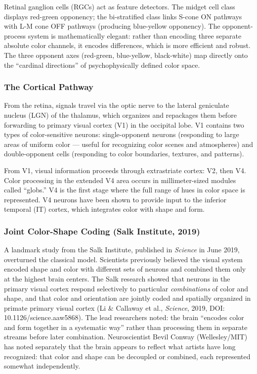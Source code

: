 \documentclass[11pt,letterpaper]{article}
\begin{document}
Retinal ganglion cells (RGCs) act as feature detectors. The midget cell class displays red-green opponency; the bi-stratified class links S-cone ON pathways with L-M cone OFF pathways (producing blue-yellow opponency). The opponent-process system is mathematically elegant: rather than encoding three separate absolute color channels, it encodes differences, which is more efficient and robust. The three opponent axes (red-green, blue-yellow, black-white) map directly onto the ``cardinal directions'' of psychophysically defined color space.

\subsubsection{The Cortical Pathway}

From the retina, signals travel via the optic nerve to the lateral geniculate nucleus (LGN) of the thalamus, which organizes and repackages them before forwarding to primary visual cortex (V1) in the occipital lobe. V1 contains two types of color-sensitive neurons: single-opponent neurons (responding to large areas of uniform color --- useful for recognizing color scenes and atmospheres) and double-opponent cells (responding to color boundaries, textures, and patterns).

From V1, visual information proceeds through extrastriate cortex: V2, then V4. Color processing in the extended V4 area occurs in millimeter-sized modules called ``globs.'' V4 is the first stage where the full range of hues in color space is represented. V4 neurons have been shown to provide input to the inferior temporal (IT) cortex, which integrates color with shape and form.

\subsubsection{Joint Color-Shape Coding (Salk Institute, 2019)}

A landmark study from the Salk Institute, published in \textit{Science} in June 2019, overturned the classical model. Scientists previously believed the visual system encoded shape and color with different sets of neurons and combined them only at the highest brain centers. The Salk research showed that neurons in the primary visual cortex respond selectively to particular \textit{combinations} of color and shape, and that color and orientation are jointly coded and spatially organized in primate primary visual cortex (Li \& Callaway et al., \textit{Science}, 2019, DOI: 10.1126/science.aaw5868). The lead researchers noted: the brain ``encodes color and form together in a systematic way'' rather than processing them in separate streams before later combination. Neuroscientist Bevil Conway (Wellesley/MIT) has noted separately that the brain appears to reflect what artists have long recognized: that color and shape can be decoupled or combined, each represented somewhat independently.
\end{document}
